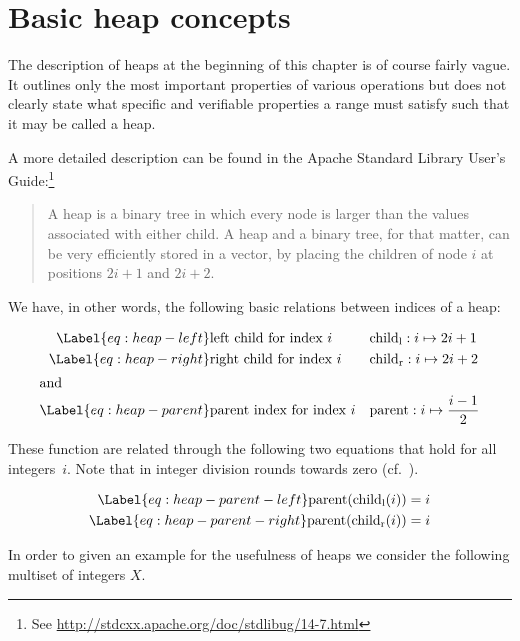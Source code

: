 
\section{Basic heap concepts}

The description of heaps at the beginning of this chapter is of course fairly vague.
It outlines only the most important properties
of various operations but does not clearly state what specific and verifiable
properties a range must satisfy such that it may be called a heap.

A more detailed description can be found in the Apache \cxx Standard Library User's Guide:\footnote{
  See \url{http://stdcxx.apache.org/doc/stdlibug/14-7.html}
}

\begin{quote}
A heap is a binary tree in which every node is larger than the values
associated with either child. A heap and a binary tree, for that matter,
can be very efficiently stored in a vector, by placing the children of
node $i$
at positions $2i + 1$ and $2i + 2$.
\end{quote}

We have, in other words, the following basic relations between indices of a heap:

\begin{align}
\Label{eq:heap-left}
   &\text{left child for index $i$}   && \mathrm{child_l}: i \mapsto 2i + 1  \\
\Label{eq:heap-right}
   &\text{right child for index $i$}  && \mathrm{child_r}: i \mapsto 2i + 2  \\
\intertext{and}
\Label{eq:heap-parent}
   &\text{parent index for index $i$}  && \mathrm{parent}: i \mapsto \frac{i - 1}{2}
\end{align}


These function are related through the following two equations
that hold for all integers~$i$.
Note that in \acsl integer division rounds towards zero (cf.\ \cite[\S 2.2.4]{ACSLSpec}).

\begin{align}
\Label{eq:heap-parent-left}
   \mathrm{parent}(\mathrm{child_l}(i)) &= i \\
\Label{eq:heap-parent-right}
   \mathrm{parent}(\mathrm{child_r}(i)) &= i
\end{align}


In order to given an example for the usefulness of heaps
we consider the following multiset of integers $X$.

